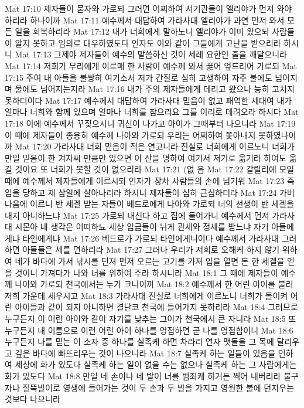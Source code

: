 Mat 17:10  제자들이 묻자와 가로되 그러면 어찌하여 서기관들이 엘리야가 먼저 와야 하리라 하나이까
Mat 17:11  예수께서 대답하여 가라사대 엘리야가 과연 먼저 와서 모든 일을 회복하리라
Mat 17:12  내가 너희에게 말하노니 엘리야가 이미 왔으되 사람들이 알지 못하고 임의로 대우하였도다 인자도 이와 같이 그들에게 고난을 받으리라 하시니
Mat 17:13  그제야 제자들이 예수의 말씀하신 것이 세례 요한인 줄을 깨달으니라
Mat 17:14  저희가 무리에게 이르매 한 사람이 예수께 와서 꿇어 엎드리어 가로되
Mat 17:15  주여 내 아들을 불쌍히 여기소서 저가 간질로 심히 고생하여 자주 불에도 넘어지며 물에도 넘어지는지라
Mat 17:16  내가 주의 제자들에게 데리고 왔으나 능히 고치지 못하더이다
Mat 17:17  예수께서 대답하여 가라사대 믿음이 없고 패역한 세대여 내가 얼마나 너희와 함께 있으며 얼마나 너희를 참으리요 그를 이리로 데려오라 하시다
Mat 17:18  이에 예수께서 꾸짖으시니 귀신이 나가고 아이가 그때부터 나으니라
Mat 17:19  이 때에 제자들이 종용히 예수께 나아와 가로되 우리는 어찌하여 쫓아내지 못하였나이까
Mat 17:20  가라사대 너희 믿음이 적은 연고니라 진실로 너희에게 이르노니 너희가 만일 믿음이 한 겨자씨 만큼만 있으면 이 산을 명하여 여기서 저기로 옮기라 하여도 옮길 것이요 또 너희가 못할 것이 없으리라
Mat 17:21  (없 음
Mat 17:22  갈릴리에 모일 때에 예수께서 제자들에게 이르시되 인자가 장차 사람들의 손에 넘기워
Mat 17:23  죽임을 당하고 제 삼일에 살아나리라 하시니 제자들이 심히 근심하더라
Mat 17:24  가버나움에 이르니 반 세겔 받는 자들이 베드로에게 나아와 가로되 너의 선생이 반 세겔을 내지 아니하느냐
Mat 17:25  가로되 내신다 하고 집에 들어가니 예수께서 먼저 가라사대 시몬아 네 생각은 어떠하뇨 세상 임금들이 뉘게 관세와 정세를 받느냐 자기 아들에게냐 타인에게냐
Mat 17:26  베드로가 가로되 타인에게니이다 예수께서 가라사대 그러하면 아들들은 세를 면하리라
Mat 17:27  그러나 우리가 저희로 오해케 하지 않기 위하여 네가 바다에 가서 낚시를 던져 먼저 오르는 고기를 가져 입을 열면 돈 한 세겔을 얻을 것이니 가져다가 나와 너를 위하여 주라 하시니라
Mat 18:1  그 때에 제자들이 예수께 나아와 가로되 천국에서는 누가 크니이까
Mat 18:2  예수께서 한 어린 아이를 불러 저희 가운데 세우시고
Mat 18:3  가라사대 진실로 너희에게 이르노니 너희가 돌이켜 어린 아이들과 같이 되지 아니하면 결단코 천국에 들어가지 못하리라
Mat 18:4  그러므로 누구든지 이 어린 아이와 같이 자기를 낮추는 그이가 천국에서 큰 자니라
Mat 18:5  또 누구든지 내 이름으로 이런 어린 아이 하나를 영접하면 곧 나를 영접함이니
Mat 18:6  누구든지 나를 믿는 이 소자 중 하나를 실족케 하면 차라리 연자 맷돌을 그 목에 달리우고 깊은 바다에 빠뜨리우는 것이 나으니라
Mat 18:7  실족케 하는 일들이 있음을 인하여 세상에 화가 있도다 실족케 하는 일이 없을 수는 없으나 실족케 하는 그 사람에게는 화가 있도다
Mat 18:8  만일 네 손이나 네 발이 너를 범죄케 하거든 찍어 내버리라 불구자나 절뚝발이로 영생에 들어가는 것이 두 손과 두 발을 가지고 영원한 불에 던지우는 것보다 나으니라
